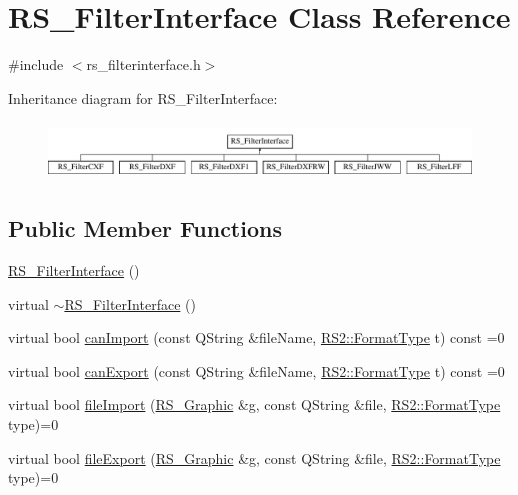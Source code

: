 \hypertarget{classRS__FilterInterface}{\section{R\-S\-\_\-\-Filter\-Interface Class Reference}
\label{classRS__FilterInterface}
}


{\ttfamily \#include $<$rs\-\_\-filterinterface.\-h$>$}

Inheritance diagram for R\-S\-\_\-\-Filter\-Interface\-:\begin{figure}[H]
\begin{center}
\leavevmode
\includegraphics[height=1.530055cm]{classRS__FilterInterface}
\end{center}
\end{figure}
\subsection*{Public Member Functions}
\begin{DoxyCompactItemize}
\item 
\hyperlink{classRS__FilterInterface_ab7d0f43692efacdfaf86f3b77036c5e1}{R\-S\-\_\-\-Filter\-Interface} ()
\item 
virtual \hyperlink{classRS__FilterInterface_a13cfbcfea48ebd819ff51d8720eb9699}{$\sim$\-R\-S\-\_\-\-Filter\-Interface} ()
\item 
virtual bool \hyperlink{classRS__FilterInterface_a62540c02649ca2040be61e5ce9e56742}{can\-Import} (const Q\-String \&file\-Name, \hyperlink{classRS2_a077a6c94c9a0ab9962c4d4a612c7189b}{R\-S2\-::\-Format\-Type} t) const =0
\item 
virtual bool \hyperlink{classRS__FilterInterface_af96c8b390ee351e7b7112a974a52828c}{can\-Export} (const Q\-String \&file\-Name, \hyperlink{classRS2_a077a6c94c9a0ab9962c4d4a612c7189b}{R\-S2\-::\-Format\-Type} t) const =0
\item 
virtual bool \hyperlink{classRS__FilterInterface_a6d4bf32c02a4c61f8465acc78b10e090}{file\-Import} (\hyperlink{classRS__Graphic}{R\-S\-\_\-\-Graphic} \&g, const Q\-String \&file, \hyperlink{classRS2_a077a6c94c9a0ab9962c4d4a612c7189b}{R\-S2\-::\-Format\-Type} type)=0
\item 
virtual bool \hyperlink{classRS__FilterInterface_a85601a186a66bbf6bedaed7b79cd034f}{file\-Export} (\hyperlink{classRS__Graphic}{R\-S\-\_\-\-Graphic} \&g, const Q\-String \&file, \hyperlink{classRS2_a077a6c94c9a0ab9962c4d4a612c7189b}{R\-S2\-::\-Format\-Type} type)=0
\end{DoxyCompactItemize}
